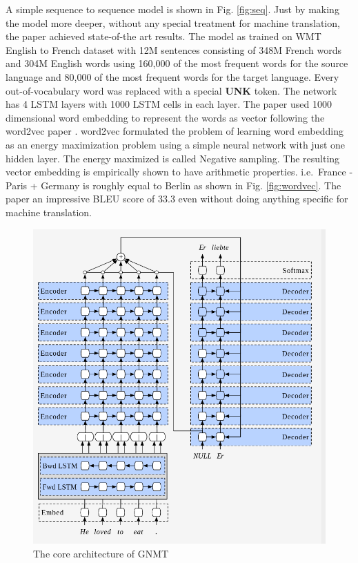 \documentclass[a4paper]{article}
\begin{document}
A simple  sequence  to sequence  model is shown in Fig.  \ref{fig:seq}.  Just by
making  the  model more  deeper,  without  any  special  treatment  for  machine
translation, the paper achieved  state-of-the art results. The model as  trained
on WMT  English  to French dataset  with 12M sentences consisting of 348M French
words and 304M  English words using 160,000 of  the  most frequent words for the
source  language  and 80,000 of the most frequent words for the target language.
Every out-of-vocabulary word was replaced with a special \textbf{UNK} token. The
network has  4  LSTM layers with 1000 LSTM cells in each  layer. The  paper used
1000  dimensional word  embedding to represent the words as vector following the
word2vec paper \cite{mikolov2013distributed}. word2vec formulated the problem of
learning word embedding as an  energy maximization problem using a simple neural
network  with just one hidden layer. The  energy maximized  is  called  Negative
sampling. The resulting vector embedding is empirically shown to have arithmetic
properties.  i.e. $\,$France  -  Paris  + Germany  is roughly equal to Berlin as
shown in Fig. \ref{fig:wordvec}. The paper an impressive BLEU score of 33.3 even
without doing anything specific for machine translation.


\begin{figure}
  \centering
  \includegraphics[width=.9\linewidth]{img/gnmt_1.png}
  \caption{The core architecture of GNMT }
  \label{fig:gnmt1}
\end{figure}
\end{document}
